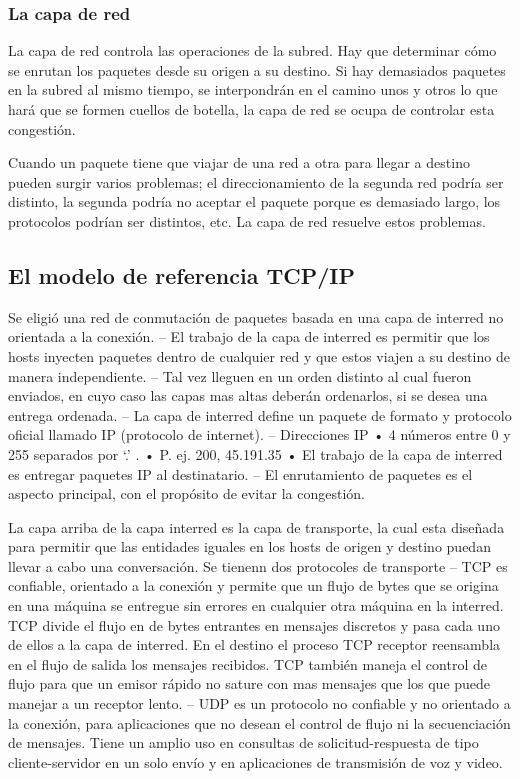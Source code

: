 \documentclass[10pt,a4paper]{report}
\begin{document}
\subsubsection{La capa de red}
\par La capa de red controla las operaciones de la subred. Hay que determinar cómo se enrutan los paquetes desde su origen a su destino. Si hay demasiados paquetes en la subred al mismo tiempo, se interpondrán en el camino unos y otros lo que hará que se formen cuellos de botella, la capa de red se ocupa de controlar esta congestión.
\par Cuando un paquete tiene que viajar de una red a otra para llegar a destino pueden surgir varios problemas; el direccionamiento de la segunda red podría ser distinto, la segunda podría no aceptar el paquete porque es demasiado largo, los protocolos podrían ser distintos, etc. La capa de red resuelve estos problemas.

\subsection{El modelo de referencia TCP/IP}

Se eligió una red de conmutación de paquetes basada en una capa de interred no 
orientada a la conexión.
– El trabajo de la capa de interred es permitir que los hosts inyecten paquetes dentro de cualquier red y que estos viajen a su destino de manera independiente.
– Tal vez lleguen en un orden distinto al cual fueron enviados, en cuyo caso las capas mas altas deberán ordenarlos, si se desea una entrega ordenada.
– La capa de interred define un paquete de formato y protocolo oficial llamado IP (protocolo de internet).
– Direcciones IP
• 4 números entre 0 y 255 separados por ‘.’ .
• P. ej. 200, 45.191.35
• El trabajo de la capa de interred es entregar paquetes IP al destinatario.
– El enrutamiento de paquetes es el aspecto principal, con el propósito de evitar la congestión.

 La capa arriba de la capa interred es la capa de transporte, la cual esta diseñada para permitir que las entidades iguales en los hosts de origen y destino puedan llevar a cabo una conversación.
 Se tienenn dos protocoles de transporte
– TCP es confiable, orientado a la conexión y permite que un flujo de bytes que se origina en una máquina se entregue sin errores en cualquier otra máquina en la interred.
 TCP divide el flujo en de bytes entrantes en mensajes discretos y pasa cada uno de ellos a la capa de interred.
 En el destino el proceso TCP receptor reensambla en el flujo de salida los mensajes recibidos.
 TCP también maneja el control de flujo para que un emisor rápido no sature con mas mensajes que los que puede manejar a un receptor lento.
– UDP es un protocolo no confiable y no orientado a la conexión, para aplicaciones que no desean el control de flujo ni la secuenciación de mensajes.
 Tiene un amplio uso en consultas de solicitud-respuesta de tipo cliente-servidor en un solo envío y en aplicaciones de transmisión de voz y video.
\end{document}
